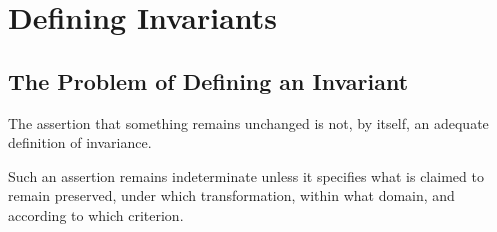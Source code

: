 %
%
%
%
%

\section{Defining Invariants}
\label{sec:defining-invariants}

\subsection{The Problem of Defining an Invariant}

The assertion that something remains unchanged is not,
by itself, an adequate definition of invariance.

Such an assertion remains indeterminate unless it specifies
what is claimed to remain preserved, under which
transformation, within what domain, and according to
which criterion.

